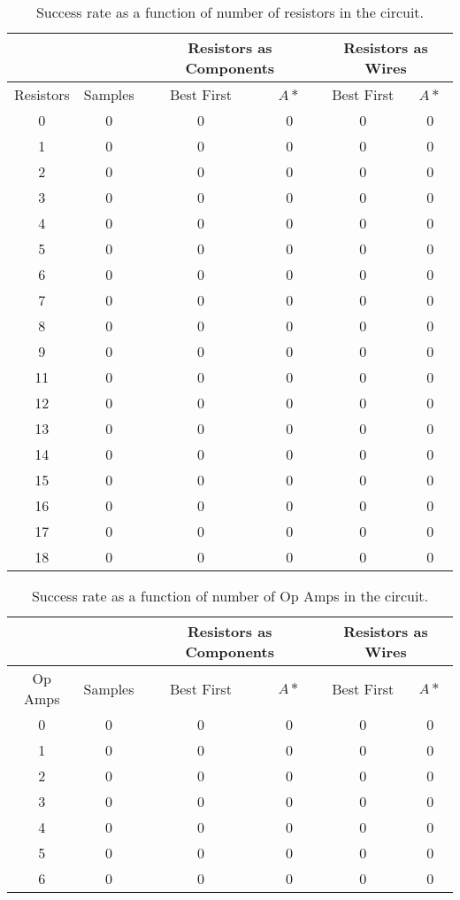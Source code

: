 \begin{table}[H]
\begin{center}
\begin{singlespace}
\begin{tabular}{| c | c || c | c | c | c |}
\hline
 & & \multicolumn{2}{|c|}{Resistors as Components} & \multicolumn{2}{|c|}{
 Resistors as Wires} \\
\hline
Resistors & Samples & Best First & $A*$ & Best First & $A*$ \\
\hline\hline
0 & 0 & 0 & 0 & 0 & 0 \\
1 & 0 & 0 & 0 & 0 & 0 \\
2 & 0 & 0 & 0 & 0 & 0 \\
3 & 0 & 0 & 0 & 0 & 0 \\
4 & 0 & 0 & 0 & 0 & 0 \\
5 & 0 & 0 & 0 & 0 & 0 \\
6 & 0 & 0 & 0 & 0 & 0 \\
7 & 0 & 0 & 0 & 0 & 0 \\
8 & 0 & 0 & 0 & 0 & 0 \\
9 & 0 & 0 & 0 & 0 & 0 \\
11 & 0 & 0 & 0 & 0 & 0 \\
12 & 0 & 0 & 0 & 0 & 0 \\
13 & 0 & 0 & 0 & 0 & 0 \\
14 & 0 & 0 & 0 & 0 & 0 \\
15 & 0 & 0 & 0 & 0 & 0 \\
16 & 0 & 0 & 0 & 0 & 0 \\
17 & 0 & 0 & 0 & 0 & 0 \\
18 & 0 & 0 & 0 & 0 & 0 \\
\hline
\end{tabular}
\end{singlespace}
\end{center}
\caption{Success rate as a function of number of resistors in the circuit.}
\end{table}

\begin{table}[H]
\begin{center}
\begin{singlespace}
\begin{tabular}{| c | c || c | c | c | c |}
\hline
 & & \multicolumn{2}{|c|}{Resistors as Components} & \multicolumn{2}{|c|}{
 Resistors as Wires} \\
\hline
Op Amps & Samples & Best First & $A*$ & Best First & $A*$ \\
\hline\hline
0 & 0 & 0 & 0 & 0 & 0 \\
1 & 0 & 0 & 0 & 0 & 0 \\
2 & 0 & 0 & 0 & 0 & 0 \\
3 & 0 & 0 & 0 & 0 & 0 \\
4 & 0 & 0 & 0 & 0 & 0 \\
5 & 0 & 0 & 0 & 0 & 0 \\
6 & 0 & 0 & 0 & 0 & 0 \\
\hline
\end{tabular}
\end{singlespace}
\end{center}
\caption{Success rate as a function of number of Op Amps in the circuit.}
\end{table}

